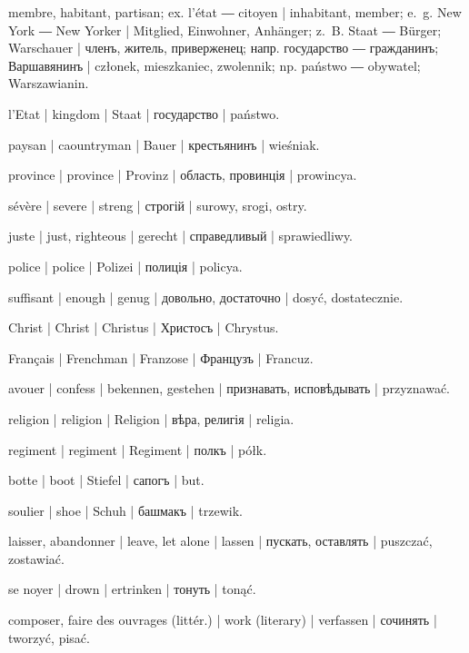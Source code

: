 \begin{ekzvocab}{1em}
 membre, habitant, partisan; ex.  l’état ―  citoyen | inhabitant, member; e.~g.  New York ―  New Yorker | Mitglied, Einwohner, Anhänger; z.~B.  Staat ―  Bürger;  Warschauer | членъ, житель, приверженец; напр.  государство ―  гражданинъ;  Варшавянинъ | członek, mieszkaniec, zwolennik; np.  państwo ―  obywatel;  Warszawianin.

 l’Etat | kingdom | Staat | государство | państwo.

 paysan | caountryman | Bauer | крестьянинъ | wieśniak.

 province | province | Provinz | область, провинція | prowincya.

 sévère | severe | streng | строгій | surowy, srogi, ostry.

 juste | just, righteous | gerecht | справедливый | sprawiedliwy.

 police | police | Polizei | полиція | policya.

 suffisant | enough | genug | довольно, достаточно | dosyć, dostatecznie.

 Christ | Christ | Christus | Христосъ | Chrystus.

 Français | Frenchman | Franzose | Французъ | Francuz.

 avouer | confess | bekennen, gestehen | признавать, исповѣдывать | przyznawać.

 religion | religion | Religion | вѣра, религія | religia.

 regiment | regiment | Regiment | полкъ | półk.

 botte | boot | Stiefel | сапогъ | but.

 soulier | shoe | Schuh | башмакъ | trzewik.

 laisser, abandonner | leave, let alone | lassen | пускать, оставлять | puszczać, zostawiać.

 se noyer | drown | ertrinken | тонуть | tonąć.

 composer, faire des ouvrages (littér.) | work (literary) | verfassen | сочинять | tworzyć, pisać.


\end{ekzvocab}
